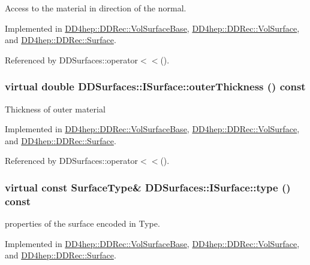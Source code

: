 Access to the material in direction of the normal. 

Implemented in \hyperlink{class_d_d4hep_1_1_d_d_rec_1_1_vol_surface_base_a26269d37153a91b4f23ea05b97504ab4}{DD4hep::DDRec::VolSurfaceBase}, \hyperlink{class_d_d4hep_1_1_d_d_rec_1_1_vol_surface_a65195963a086380a08fb14762108bad2}{DD4hep::DDRec::VolSurface}, and \hyperlink{class_d_d4hep_1_1_d_d_rec_1_1_surface_a8844d989cfc893e8fc5e34d05cb2e410}{DD4hep::DDRec::Surface}.

Referenced by DDSurfaces::operator$<$$<$().\hypertarget{class_d_d_surfaces_1_1_i_surface_aa2559a8904e474835c5d24c243a44909}{
\subsubsection[{outerThickness}]{\setlength{\rightskip}{0pt plus 5cm}virtual double DDSurfaces::ISurface::outerThickness () const}}
\label{class_d_d_surfaces_1_1_i_surface_aa2559a8904e474835c5d24c243a44909}
Thickness of outer material 

Implemented in \hyperlink{class_d_d4hep_1_1_d_d_rec_1_1_vol_surface_base_a2b6e77c50e5b060711b9fcae604d5864}{DD4hep::DDRec::VolSurfaceBase}, \hyperlink{class_d_d4hep_1_1_d_d_rec_1_1_vol_surface_abf78c6b50d2959a7e1f50ed36fc759f6}{DD4hep::DDRec::VolSurface}, and \hyperlink{class_d_d4hep_1_1_d_d_rec_1_1_surface_a1f75aae21b3cfc2fca58a8e8a340703e}{DD4hep::DDRec::Surface}.

Referenced by DDSurfaces::operator$<$$<$().\hypertarget{class_d_d_surfaces_1_1_i_surface_aab772d11a61d7ae966d535be0da2a626}{
\subsubsection[{type}]{\setlength{\rightskip}{0pt plus 5cm}virtual const {\bf SurfaceType}\& DDSurfaces::ISurface::type () const}}
\label{class_d_d_surfaces_1_1_i_surface_aab772d11a61d7ae966d535be0da2a626}


properties of the surface encoded in Type. 

Implemented in \hyperlink{class_d_d4hep_1_1_d_d_rec_1_1_vol_surface_base_a32c932ec7f8a44321c9ea07ac56ab259}{DD4hep::DDRec::VolSurfaceBase}, \hyperlink{class_d_d4hep_1_1_d_d_rec_1_1_vol_surface_a3911ecafb91850168cadebc3ab2d5092}{DD4hep::DDRec::VolSurface}, and \hyperlink{class_d_d4hep_1_1_d_d_rec_1_1_surface_ac2500033e175992484aba8956a27bdd6}{DD4hep::DDRec::Surface}.

